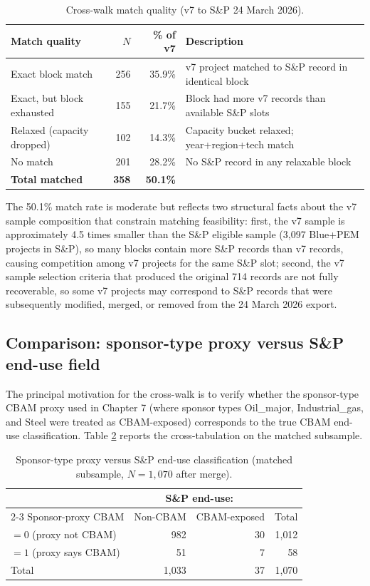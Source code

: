 \documentclass[11pt,a4paper]{article}
\begin{document}
\begin{table}[ht]
\centering
\caption{Cross-walk match quality (v7 to S\&P 24 March 2026).}
\label{tab:app-matching-quality}
\begin{tabular}{lrrl}
\toprule
Match quality & $N$ & \% of v7 & Description \\
\midrule
Exact block match           & 256 & 35.9\% & v7 project matched to S\&P record in identical block \\
Exact, but block exhausted  & 155 & 21.7\% & Block had more v7 records than available S\&P slots \\
Relaxed (capacity dropped)  & 102 & 14.3\% & Capacity bucket relaxed; year+region+tech match \\
No match                    & 201 & 28.2\% & No S\&P record in any relaxable block \\
\midrule
\textbf{Total matched}      & \textbf{358} & \textbf{50.1\%} & \\
\bottomrule
\end{tabular}
\end{table}

The 50.1\% match rate is moderate but reflects two structural facts about the v7 sample composition that constrain matching feasibility: first, the v7 sample is approximately 4.5 times smaller than the S\&P eligible sample (3{,}097 Blue+PEM projects in S\&P), so many blocks contain more S\&P records than v7 records, causing competition among v7 projects for the same S\&P slot; second, the v7 sample selection criteria that produced the original 714 records are not fully recoverable, so some v7 projects may correspond to S\&P records that were subsequently modified, merged, or removed from the 24 March 2026 export.

\subsection{Comparison: sponsor-type proxy versus S\&P end-use field}

The principal motivation for the cross-walk is to verify whether the sponsor-type CBAM proxy used in Chapter 7 (where sponsor types Oil\_major, Industrial\_gas, and Steel were treated as CBAM-exposed) corresponds to the true CBAM end-use classification. Table \ref{tab:app-proxy-comparison} reports the cross-tabulation on the matched subsample.

\begin{table}[ht]
\centering
\caption{Sponsor-type proxy versus S\&P end-use classification (matched subsample, $N = 1{,}070$ after merge).}
\label{tab:app-proxy-comparison}
\begin{tabular}{lrrr}
\toprule
& \multicolumn{2}{c}{S\&P end-use:} & \\
\cmidrule(lr){2-3}
Sponsor-proxy CBAM & Non-CBAM & CBAM-exposed & Total \\
\midrule
$=0$ (proxy not CBAM) & 982 & 30 & 1{,}012 \\
$=1$ (proxy says CBAM) & 51  & 7  & 58 \\
\midrule
Total & 1{,}033 & 37 & 1{,}070 \\
\bottomrule
\end{tabular}
\end{table}
\end{document}
